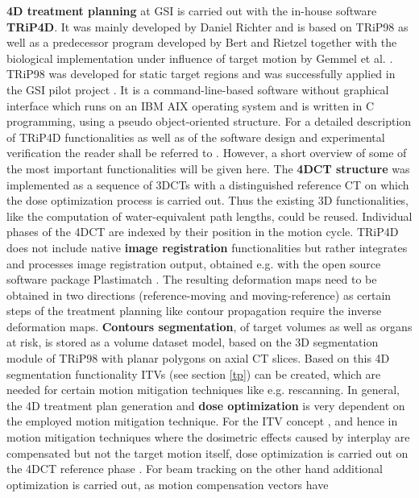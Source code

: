 \textbf{4D treatment planning} at GSI is carried out with the in-house software \textbf{TRiP4D}. It was mainly developed by Daniel Richter \cite{Ric13} and 
is based on TRiP98 as well as a predecessor program developed by Bert and Rietzel \cite{Ber07b} together with the biological implementation 
under influence of target motion by Gemmel et al. \cite{Gem11}.  
TRiP98 was developed for static target regions and was successfully applied in the GSI pilot project \cite{Krae10, Krae00, Krae00b}.  
It is a command-line-based software without graphical interface which runs on an IBM AIX operating system and is written in C 
programming, using a pseudo object-oriented structure. For a detailed description of TRiP4D functionalities as well as of the software 
design and experimental verification the reader shall be referred to \cite{Ric13}. However, a short overview of some of the most important 
functionalities will be given here.\newline
\newline
The \textbf{4DCT structure} was implemented as a sequence of 3DCTs with a distinguished reference CT on which the dose optimization 
process is carried out. Thus the existing 3D functionalities, like the computation of water-equivalent path lengths, could be reused. 
Individual phases of the 4DCT are indexed by their position in the motion cycle. 
TRiP4D does not include native \textbf{image registration} functionalities but rather integrates and processes image registration output, obtained e.g. 
with the open source software package Plastimatch \cite{Sharp07}. The resulting deformation maps need to be obtained in two directions 
(reference-moving and moving-reference) as certain steps of the treatment planning like contour propagation require the inverse deformation 
maps.
\textbf{Contours segmentation}, of target volumes as well as organs at risk, is stored as a volume dataset model, based on the 3D 
segmentation module of TRiP98 with planar polygons on axial CT slices. Based on this 4D segmentation functionality ITVs (see section \ref{tp}) 
can be created, which are needed for certain motion mitigation 
techniques like e.g. rescanning. In general, the 4D treatment plan generation and \textbf{dose optimization} is very dependent on 
the employed motion mitigation technique. For the ITV concept \cite{Gra12}, and hence in motion mitigation techniques where the dosimetric 
effects caused by interplay are compensated but not the target motion itself, dose optimization is carried out on the 4DCT 
reference phase \cite{Ric13}. For beam tracking on the other hand additional optimization is carried out, as motion compensation vectors have 
